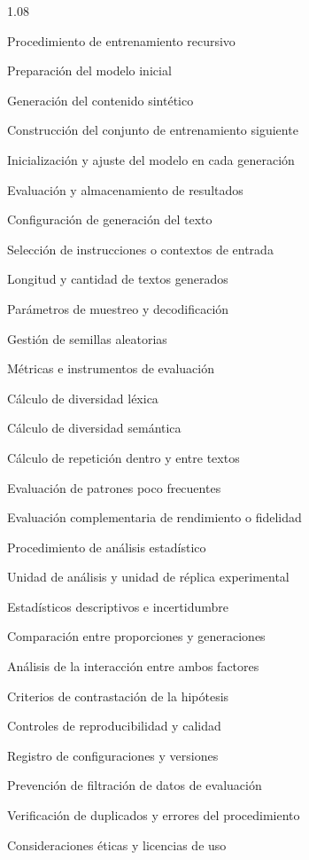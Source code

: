 \documentclass[12pt,letterpaper]{article}
\begin{document}
\begin{spacing}{1.08}
\begin{apartados}
\begin{apartados}
\end{apartados}
\item Procedimiento de entrenamiento recursivo
\begin{apartados}
\item Preparación del modelo inicial
\item Generación del contenido sintético
\item Construcción del conjunto de entrenamiento siguiente
\item Inicialización y ajuste del modelo en cada generación
\item Evaluación y almacenamiento de resultados
\end{apartados}
\item Configuración de generación del texto
\begin{apartados}
\item Selección de instrucciones o contextos de entrada
\item Longitud y cantidad de textos generados
\item Parámetros de muestreo y decodificación
\item Gestión de semillas aleatorias
\end{apartados}
\item Métricas e instrumentos de evaluación
\begin{apartados}
\item Cálculo de diversidad léxica
\item Cálculo de diversidad semántica
\item Cálculo de repetición dentro y entre textos
\item Evaluación de patrones poco frecuentes
\item Evaluación complementaria de rendimiento o fidelidad
\end{apartados}
\item Procedimiento de análisis estadístico
\begin{apartados}
\item Unidad de análisis y unidad de réplica experimental
\item Estadísticos descriptivos e incertidumbre
\item Comparación entre proporciones y generaciones
\item Análisis de la interacción entre ambos factores
\item Criterios de contrastación de la hipótesis
\end{apartados}
\item Controles de reproducibilidad y calidad
\begin{apartados}
\item Registro de configuraciones y versiones
\item Prevención de filtración de datos de evaluación
\item Verificación de duplicados y errores del procedimiento
\end{apartados}
\item Consideraciones éticas y licencias de uso
\end{apartados}


\end{spacing}
\end{document}
